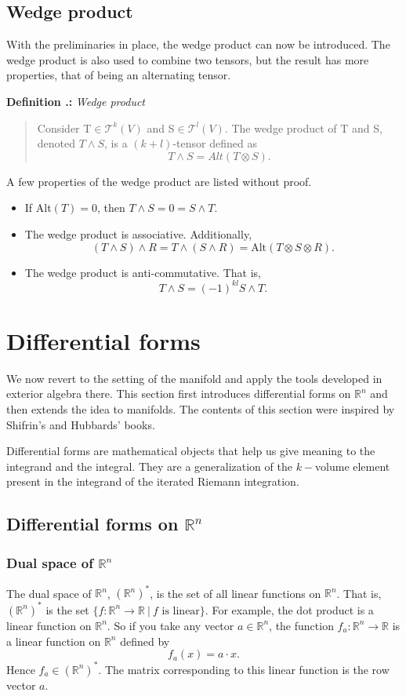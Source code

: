 \documentclass{article}
\newcounter{definition}[section]
\renewcommand{\thedefinition}{\thesection.\arabic{definition}}
\newenvironment{definition}[1] %
{%
    \refstepcounter{definition}%
    \noindent\textbf{Definition \thedefinition:} {\textit{#1}}\par\nobreak\noindent
    \begin{quote}
}%
{%
    \end{quote}
}
\begin{document}
\subsection{Wedge product}
With the preliminaries in place, the wedge product can now be introduced. The wedge product is also used to combine two tensors, but the result has more properties, that of being an alternating tensor.

\begin{definition}{Wedge product}
    Consider T$\in \mathcal{T}^k (V)$ and S$\in \mathcal{T}^l (V)$. The wedge product of T and S, denoted $T \wedge S$, is a $(k+l)$-tensor defined as 
    \[
        T \wedge S = Alt(T \otimes S).
    \]    
\end{definition}
A few properties of the wedge product are listed without proof.
\begin{itemize}
    \item If Alt$(T) = 0$, then $T \wedge S = 0 = S \wedge T$.
    \item The wedge product is associative. Additionally, 
    $$(T \wedge S) \wedge R = T \wedge (S \wedge R) = \text{Alt}(T\otimes S\otimes R).$$
    \item The wedge product is anti-commutative. That is,
    $$T \wedge S = (-1)^{kl} S \wedge T.$$
\end{itemize}
 

\section{Differential forms}

We now revert to the setting of the manifold and apply the tools developed in exterior algebra there. This section first introduces differential forms on $\mathbb{R}^n$ and then extends the idea to manifolds. The contents of this section were inspired by Shifrin's \cite{shifrin2004multivariable} and Hubbards' \cite{hubbard2009vector} books.

Differential forms are mathematical objects that help us give meaning to the integrand and the integral. They are a generalization of the  $k-$volume element present in the integrand of the iterated Riemann integration. 
\subsection{Differential forms on $\mathbb{R}^n$}
\subsubsection{Dual space of $\mathbb{R}^n$}
The dual space of $\mathbb{R}^n$, $(\mathbb{R}^n)^*$, is the set of all linear functions on $\mathbb{R}^n$. That is, $(\mathbb{R}^n)^*$ is the set $\{ f: \mathbb{R}^n \to \mathbb{R} \ | \ f \text{ is linear} \}$. For example, the dot product is a linear function on $\mathbb{R}^n$. So if you take any vector $a \in \mathbb{R}^n$, the function $f_a: \mathbb{R}^n \to \mathbb{R}$ is a linear function on $\mathbb{R}^n$ defined by
$$f_a(x) = a \cdot x.$$ 
Hence $f_a \in (\mathbb{R}^n)^*$. The matrix corresponding to this linear function is the row vector $a$.
\end{document}
